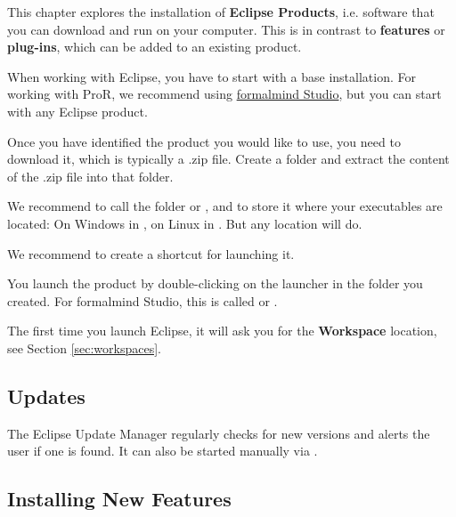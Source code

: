 This chapter explores the installation of \textbf{Eclipse Products}, i.e. software that you can download and run on your computer.  This is in contrast to \textbf{features} or \textbf{plug-ins}, which can be added to an existing product.

When working with Eclipse, you have to start with a base installation.  For working with ProR, we recommend using \href{http://formalmind.com/studio}{formalmind Studio}, but you can start with any Eclipse product.

Once you have identified the product you would like to use, you need to download it, which is typically a .zip file.  Create a folder and extract the content of the .zip file into that folder.

\begin{info}
We recommend to call the folder  or , and to store it where your executables are located: On Windows in , on Linux in .  But any location will do.

We recommend to create a shortcut for launching it.
\end{info}

You launch the product by double-clicking on the launcher in the folder you created.  For formalmind Studio, this is called  or .

The first time you launch Eclipse, it will ask you for the \textbf{Workspace} location, see Section \ref{sec:workspaces}.

\subsection{Updates}
\label{sec:update}

The Eclipse Update Manager regularly checks for new versions and alerts the user if one is found.  It can also be started manually via .

\subsection{Installing New Features}
\label{sec:install-add-on}

